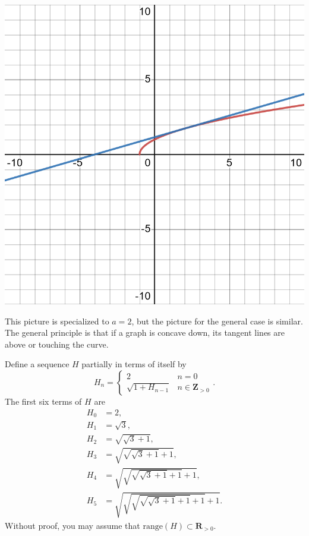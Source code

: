 \documentclass[12pt,fleqn,answers]{exam}
\newcommand{\reals}{\mathbf{R}}
\newcommand{\integers}{\mathbf{Z}}
\newcommand{\range}{\mathrm{range}}
\begin{document}
\begin{questions}
\begin{solution}

  \includegraphics[scale=0.25]{desmos-graph(36).png}
 
 This picture is specialized to $a=2$, but the picture for the general case is similar. The general principle is that if a graph
 is concave down, its tangent lines are above or touching the curve.
\end{solution}

\question Define a sequence $H$ partially in terms of itself by
\begin{equation*}
    H_n = \begin{cases} 2 & n=0 \\ \sqrt{1+H_{n-1}} & n \in \integers_{> 0} \end{cases}.
\end{equation*}
The first six terms of $H$ are
\begin{align*}
H_0 &=2, \\
H_1 &= \sqrt{3},\\
H_2 &= \sqrt{\sqrt{3}+1}, \\
H_3 &= \sqrt{\sqrt{\sqrt{3}+1}+1},\\
H_4 &= \sqrt{\sqrt{\sqrt{\sqrt{3}+1}+1}+1},\\
H_5 &= \sqrt{\sqrt{\sqrt{\sqrt{\sqrt{3}+1}+1}+1}+1}.
\end{align*}
Without proof, you may assume that $\range(H) \subset \reals_{>0}$.
\begin{parts}


\end{parts}
\end{questions}
\end{document}

